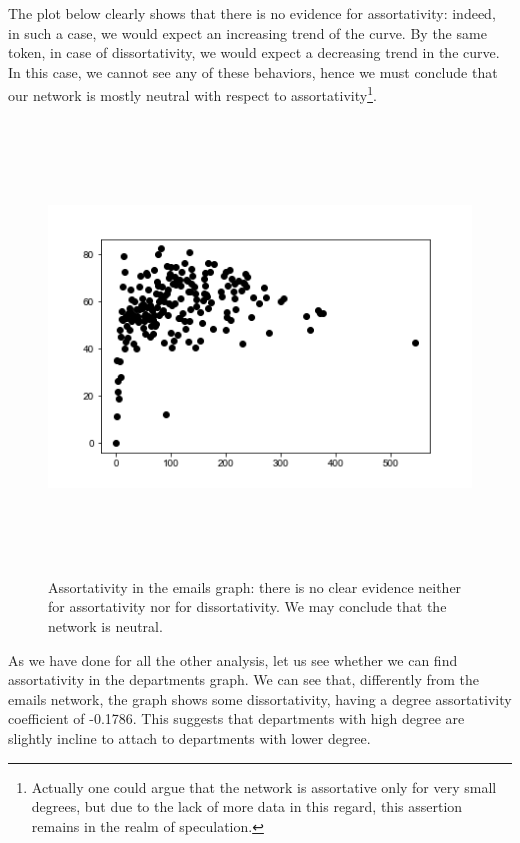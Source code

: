 \documentclass{report}
\theoremstyle{definition}
\theoremstyle{remark}
\begin{document}
The plot below clearly shows that there is no evidence for assortativity: indeed, in such a case, we would expect an increasing trend of the curve. By the same token, in case of dissortativity, we would expect a decreasing trend in the curve. In this case, we cannot see any of these behaviors, hence we must conclude that our network is mostly neutral with respect to assortativity\footnote{Actually one could argue that the network is assortative only for very small degrees, but due to the lack of more data in this regard, this assertion remains in the realm of speculation.}.
\begin{figure} [H]
	\centering
	\centerline{\includegraphics[width = 13cm, height = 12cm, keepaspectratio]{assortativity.png}}
	\label{Ass}
	\caption{Assortativity in the emails graph: there is no clear evidence neither for assortativity nor for dissortativity. We may conclude that the network is neutral.}
\end{figure}
As we have done for all the other analysis, let us see whether we can find assortativity in the departments graph. We can see that, differently from the emails network, the graph shows some dissortativity, having a degree assortativity coefficient of -0.1786. This suggests that departments with high degree are slightly incline to attach to departments with lower degree.
\end{document}
